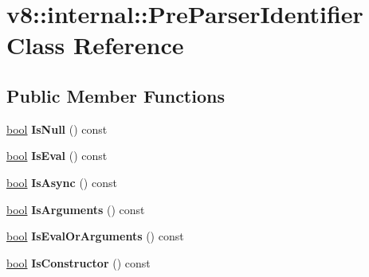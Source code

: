 \hypertarget{classv8_1_1internal_1_1PreParserIdentifier}{}\section{v8\+:\+:internal\+:\+:Pre\+Parser\+Identifier Class Reference}
\label{classv8_1_1internal_1_1PreParserIdentifier}
\subsection*{Public Member Functions}
\begin{DoxyCompactItemize}
\item 
\mbox{\label{classv8_1_1internal_1_1PreParserIdentifier_a15595bbaf058d7dd87ddb3a1e85f6a58}} 
\mbox{\hyperlink{classbool}{bool}} {\bfseries Is\+Null} () const
\item 
\mbox{\label{classv8_1_1internal_1_1PreParserIdentifier_ad111b8bd0df2890c9532b3eaef410031}} 
\mbox{\hyperlink{classbool}{bool}} {\bfseries Is\+Eval} () const
\item 
\mbox{\label{classv8_1_1internal_1_1PreParserIdentifier_a01fb73fe35f6def8dbc10b78d71115b1}} 
\mbox{\hyperlink{classbool}{bool}} {\bfseries Is\+Async} () const
\item 
\mbox{\label{classv8_1_1internal_1_1PreParserIdentifier_ae8be4972302663e16681743ab386b784}} 
\mbox{\hyperlink{classbool}{bool}} {\bfseries Is\+Arguments} () const
\item 
\mbox{\label{classv8_1_1internal_1_1PreParserIdentifier_a69f0cae3d5c43f6fc6660c6584a1bcb8}} 
\mbox{\hyperlink{classbool}{bool}} {\bfseries Is\+Eval\+Or\+Arguments} () const
\item 
\mbox{\label{classv8_1_1internal_1_1PreParserIdentifier_a991fe735e2d7932b517bfbf04863335a}} 
\mbox{\hyperlink{classbool}{bool}} {\bfseries Is\+Constructor} () const
\item 
\mbox{\label{classv8_1_1internal_1_1PreParserIdentifier_a5a31517dce1609cddb68cbb4455d8739}} 

\end{DoxyCompactItemize}
